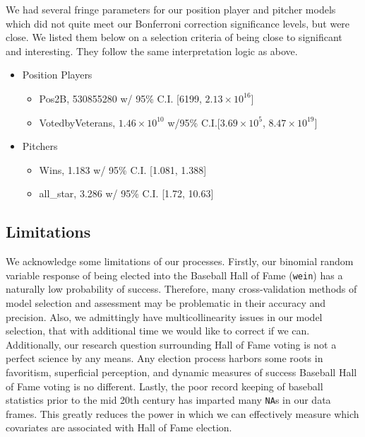 \documentclass[
]{article}
\providecommand{\tightlist}{%
  \setlength{\itemsep}{0pt}\setlength{\parskip}{0pt}}
\begin{document}
We had several fringe parameters for our position player and pitcher
models which did not quite meet our Bonferroni correction significance
levels, but were close. We listed them below on a selection criteria of
being close to significant and interesting. They follow the same
interpretation logic as above.

\begin{itemize}
\tightlist
\item
  Position Players

  \begin{itemize}
  \tightlist
  \item
    Pos2B, 530855280 w/ 95\% C.I. {[}6199, \(2.13 \times 10^{16}\){]}
  \item
    VotedbyVeterans, \(1.46 \times 10^{10}\) w/95\%
    C.I.{[}\(3.69 \times 10^{5}\), \(8.47 \times 10^{19}\){]}
  \end{itemize}
\item
  Pitchers

  \begin{itemize}
  \tightlist
  \item
    Wins, 1.183 w/ 95\% C.I. {[}1.081, 1.388{]}
  \item
    all\_star, 3.286 w/ 95\% C.I. {[}1.72, 10.63{]}
  \end{itemize}
\end{itemize}

\hypertarget{limitations}{%
\subsection{Limitations}\label{limitations}}

We acknowledge some limitations of our processes. Firstly, our binomial
random variable response of being elected into the Baseball Hall of Fame
(\texttt{wein}) has a naturally low probability of success. Therefore,
many cross-validation methods of model selection and assessment may be
problematic in their accuracy and precision. Also, we admittingly have
multicollinearity issues in our model selection, that with additional
time we would like to correct if we can. Additionally, our research
question surrounding Hall of Fame voting is not a perfect science by any
means. Any election process harbors some roots in favoritism,
superficial perception, and dynamic measures of success Baseball Hall of
Fame voting is no different. Lastly, the poor record keeping of baseball
statistics prior to the mid 20th century has imparted many \texttt{NA}s
in our data frames. This greatly reduces the power in which we can
effectively measure which covariates are associated with Hall of Fame
election.
\end{document}
